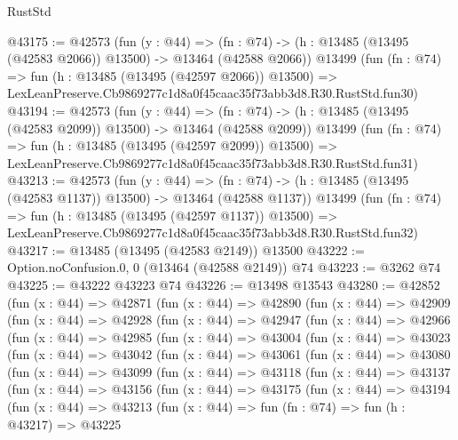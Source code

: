 \begin{lexlean}{RustStd}
\begin{coremodule}
@43175 := @42573
    (fun (y : @44) =>
    (fn : @74) -> (h : @13485 (@13495 (@42583 @2066)) @13500) -> @13464 (@42588 @2066))
    @13499
    (fun (fn : @74) =>
    fun (h : @13485 (@13495 (@42597 @2066)) @13500) =>
    LexLeanPreserve.Cb9869277c1d8a0f45caac35f73abb3d8.R30.RustStd.fun30)
@43194 := @42573
    (fun (y : @44) =>
    (fn : @74) -> (h : @13485 (@13495 (@42583 @2099)) @13500) -> @13464 (@42588 @2099))
    @13499
    (fun (fn : @74) =>
    fun (h : @13485 (@13495 (@42597 @2099)) @13500) =>
    LexLeanPreserve.Cb9869277c1d8a0f45caac35f73abb3d8.R30.RustStd.fun31)
@43213 := @42573
    (fun (y : @44) =>
    (fn : @74) -> (h : @13485 (@13495 (@42583 @1137)) @13500) -> @13464 (@42588 @1137))
    @13499
    (fun (fn : @74) =>
    fun (h : @13485 (@13495 (@42597 @1137)) @13500) =>
    LexLeanPreserve.Cb9869277c1d8a0f45caac35f73abb3d8.R30.RustStd.fun32)
@43217 := @13485 (@13495 (@42583 @2149)) @13500
@43222 := Option.noConfusion.{0, 0} (@13464 (@42588 @2149)) @74
@43223 := @3262 @74
@43225 := @43222 @43223 @74
@43226 := @13498 @13543
@43280 := @42852
    (fun (x : @44) =>
    @42871
      (fun (x : @44) =>
      @42890
        (fun (x : @44) =>
        @42909
          (fun (x : @44) =>
          @42928
            (fun (x : @44) =>
            @42947
              (fun (x : @44) =>
              @42966
                (fun (x : @44) =>
                @42985
                  (fun (x : @44) =>
                  @43004
                    (fun (x : @44) =>
                    @43023
                      (fun (x : @44) =>
                      @43042
                        (fun (x : @44) =>
                        @43061
                          (fun (x : @44) =>
                          @43080
                            (fun (x : @44) =>
                            @43099
                              (fun (x : @44) =>
                              @43118
                                (fun (x : @44) =>
                                @43137
                                  (fun (x : @44) =>
                                  @43156
                                    (fun (x : @44) =>
                                    @43175
                                      (fun (x : @44) =>
                                      @43194
                                        (fun (x : @44) =>
                                        @43213
                                          (fun (x : @44) =>
                                          fun (fn : @74) =>
                                          fun (h : @43217) =>
                                          @43225

\end{coremodule}
\end{lexlean}

